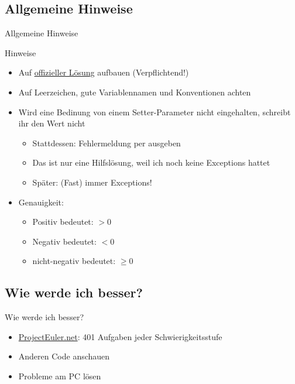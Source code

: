 \documentclass[usepdftitle=false,hyperref={pdfpagelabels=false}]{beamer}
\begin{document}
\subsection{Allgemeine Hinweise}
\begin{frame}{Allgemeine Hinweise}
    \begin{alertblock}{Hinweise}
        \begin{itemize}[<+->]
            \item Auf \href{http://baldur.iti.kit.edu/programmieren/}{offizieller Lösung} aufbauen (Verpflichtend!)
            \item Auf Leerzeichen, gute Variablennamen und Konventionen achten
            \item Wird eine Bedinung von einem Setter-Parameter nicht eingehalten, schreibt ihr den Wert nicht
            \begin{itemize}
                \item Stattdessen: Fehlermeldung per  ausgeben
                \item Das ist nur eine Hilfslösung, weil ich noch keine Exceptions hattet
                \item Später: (Fast) immer Exceptions!
            \end{itemize}
            \item Genauigkeit:
            \begin{itemize}
                \item Positiv bedeutet: $> 0$
                \item Negativ bedeutet: $< 0$
                \item nicht-negativ bedeutet: $\geq 0$
            \end{itemize}
        \end{itemize}
    \end{alertblock}
\end{frame}

\subsection{Wie werde ich besser?}
\begin{frame}{Wie werde ich besser?}
    \begin{itemize}
        \item \href{http://projecteuler.net/}{ProjectEuler.net}: 
              401 Aufgaben jeder Schwierigkeitsstufe
        \item Anderen Code anschauen
        \item Probleme am PC lösen
    \end{itemize}
\end{frame}
\end{document}
